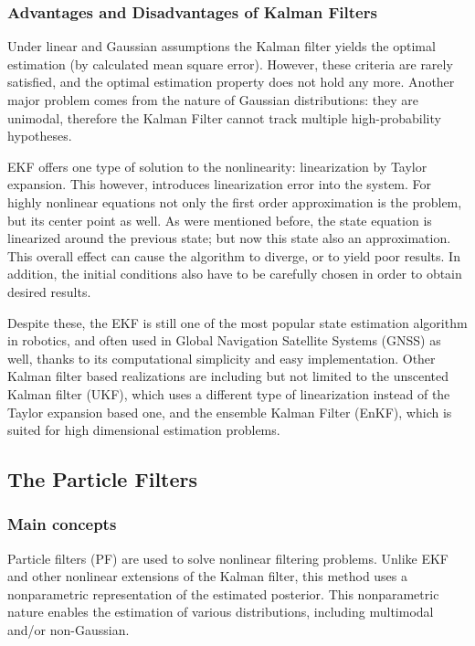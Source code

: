 \subsubsection{Advantages and Disadvantages of Kalman Filters}

Under linear and Gaussian assumptions the Kalman filter yields the optimal estimation (by calculated mean square error). However, these criteria are rarely satisfied, and the optimal estimation property does not hold any more. Another major problem comes from the nature of Gaussian distributions: they are unimodal, therefore the Kalman Filter cannot track multiple high-probability hypotheses.

EKF offers one type of solution to the nonlinearity: linearization by Taylor expansion. This however, introduces linearization error into the system. For highly nonlinear equations not only the first order approximation is the problem, but its center point as well. As were mentioned before, the state equation is linearized around the previous state; but now this state also an approximation. This overall effect can cause the algorithm to diverge, or to yield poor results. In addition, the initial conditions also have to be carefully chosen in order to obtain desired results.

Despite these, the EKF is still one of the most popular state estimation algorithm in robotics, and often used in Global Navigation Satellite Systems (GNSS) as well, thanks to its computational simplicity and easy  implementation. Other Kalman filter based realizations are including but not limited to the unscented Kalman filter (UKF), which uses a different type of linearization instead of the Taylor expansion based one, and the ensemble Kalman Filter (EnKF), which is suited for high dimensional estimation problems.

\subsection{The Particle Filters}
\subsubsection{Main concepts}

Particle filters (PF) are used to solve nonlinear filtering problems. Unlike EKF and other nonlinear extensions of the Kalman filter, this method uses a nonparametric representation of the estimated posterior. This nonparametric nature enables the estimation of various distributions, including multimodal and/or non-Gaussian.

